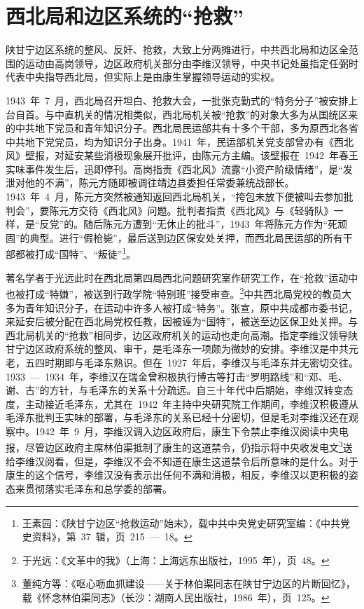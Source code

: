 \section{西北局和边区系统的“抢救”}

陕甘宁边区系统的整风、反奸、抢救，大致上分两摊进行，中共西北局和边区全范围的运动由高岗领导，边区政府机关部分由李维汉领导，中央书记处虽指定任弼时代表中央指导西北局，但实际上是由康生掌握领导运动的实权。

1943~年~7~月，西北局召开坦白、抢救大会，一批张克勤式的“特务分子”被安排上台自首。与中直机关的情况相类似，西北局机关被“抢救”的对象大多为从国统区来的中共地下党员和青年知识分子。西北局民运部共有十多个干部，多为原西北各省中共地下党党员，均为知识分子出身。1941~年，民运部机关党支部曾办有《西北风》壁报，对延安某些消极现象展开批评，由陈元方主编。该壁报在~1942~年春王实味事件发生后，迅即停刊。高岗指责《西北风》流露“小资产阶级情绪”，是“发泄对他的不满”，陈元方随即被调往靖边县委担任常委兼统战部长。1943~年~4~月，陈元方突然被通知返回西北局机关，“挎包未放下便被叫去参加批判会”，要陈元方交待《西北风》问题。批判者指责《西北风》与《轻骑队》一样，是“反党”的。随后陈元方遭到“无休止的批斗”，1943~年将陈元方作为“死顽固”的典型。进行“假枪毙”，最后送到边区保安处关押，而西北局民运部的所有干部都被打成“国特”、“叛徒”\footnote{王素园：《陕甘宁边区“抢救运动”始末》，载中共中央党史研究室编：《中共党史资料》，第~37~辑，页~215~—~18。}。

著名学者于光远此时在西北局第四局西北问题研究室作研究工作，在“抢救”运动中也被打成“特嫌”，被送到行政学院“特别班”接受审查。\footnote{于光远：《文革中的我》（上海：上海远东出版社，1995~年），页~48。}中共西北局党校的教员大多为青年知识分子，在运动中许多人被打成“特务”。张宣，原中共成都市委书记，来延安后被分配在西北局党校任教，因被诬为“国特”，被送至边区保卫处关押。与西北局机关的“抢救”相同步，边区政府机关的运动也走向高潮。指定李维汉领导陕甘宁边区政府系统的整风、审干，是毛泽东一项颇为微妙的安排。李维汉是中共元老，五四时期即与毛泽东熟识。但在~1927~年后，李维汉与毛泽东并无密切交往。1933~—~1934~年，李维汉在瑞金曾积极执行博古等打击“罗明路线”和“邓、毛、谢、古”的方针，与毛泽东的关系十分疏远。自三十年代中后期始，李维汉转变态度，主动接近毛泽东，尤其在~1942~年主持中央研究院工作期间，李维汉积极遵从毛泽东批判王实味的部署，与毛泽东的关系已经十分密切，但是毛对李维汉还在观察中。1942~年~9~月，李维汉调入边区政府后，康生下令禁止李维汉阅读中央电报，尽管边区政府主席林伯渠抵制了康生的这道禁令，仍指示将中央收发电文\footnote{董纯方等：《呕心呖血抓建设——关于林伯渠同志在陕甘宁边区的片断回忆》，载《怀念林伯渠同志》（长沙：湖南人民出版社，1986~年），页~125。}送给李维汉阅看，但是，李维汉不会不知道在康生这道禁令后所意味的是什么。对于康生的这个信号，李维汉没有表示出任何不满和消极，相反，李维汉以更积极的姿态来贯彻落实毛泽东和总学委的部署。


